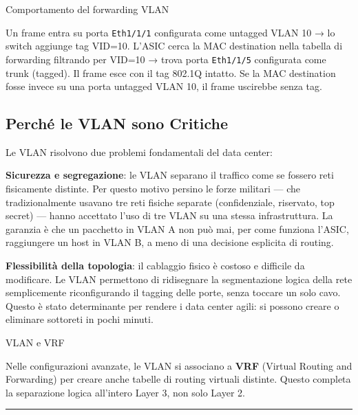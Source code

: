 \documentclass[
  italian,
  openany]{book}
\begin{document}
\begin{callouttip}{Comportamento del forwarding VLAN}

Un frame entra su porta \texttt{Eth1/1/1} configurata come untagged VLAN
10 → lo switch aggiunge tag VID=10. L'ASIC cerca la MAC destination
nella tabella di forwarding filtrando per VID=10 → trova porta
\texttt{Eth1/1/5} configurata come trunk (tagged). Il frame esce con il
tag 802.1Q intatto. Se la MAC destination fosse invece su una porta
untagged VLAN 10, il frame uscirebbe senza tag.

\end{callouttip}

\subsection{Perché le VLAN sono
Critiche}\label{perchuxe9-le-vlan-sono-critiche}

Le VLAN risolvono due problemi fondamentali del data center:

\textbf{Sicurezza e segregazione}: le VLAN separano il traffico come se
fossero reti fisicamente distinte. Per questo motivo persino le forze
militari --- che tradizionalmente usavano tre reti fisiche separate
(confidenziale, riservato, top secret) --- hanno accettato l'uso di tre
VLAN su una stessa infrastruttura. La garanzia è che un pacchetto in
VLAN A non può mai, per come funziona l'ASIC, raggiungere un host in
VLAN B, a meno di una decisione esplicita di routing.

\textbf{Flessibilità della topologia}: il cablaggio fisico è costoso e
difficile da modificare. Le VLAN permettono di ridisegnare la
segmentazione logica della rete semplicemente riconfigurando il tagging
delle porte, senza toccare un solo cavo. Questo è stato determinante per
rendere i data center agili: si possono creare o eliminare sottoreti in
pochi minuti.

\begin{calloutnote}{VLAN e VRF}

Nelle configurazioni avanzate, le VLAN si associano a \textbf{VRF}
(Virtual Routing and Forwarding) per creare anche tabelle di routing
virtuali distinte. Questo completa la separazione logica all'intero
Layer 3, non solo Layer 2.

\end{calloutnote}

\begin{center}\rule{0.5\linewidth}{0.5pt}\end{center}
\end{document}
